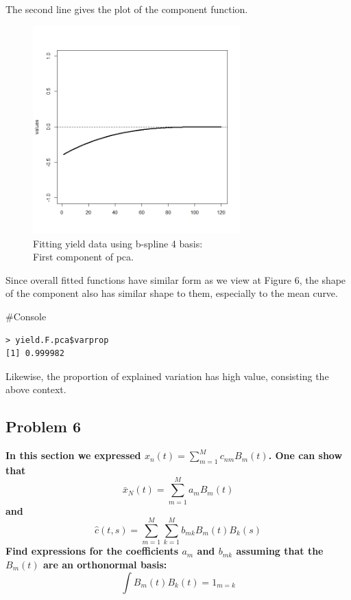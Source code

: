 \documentclass{article}
\newenvironment{console}%
{%
    \begin{mdframed}
    \#Console
    \begin{small}
}
{%
    \end{small}
    \end{mdframed}
}
\begin{document}
The second line gives the plot of the component function.
\begin{figure}[hh]
    \centering
    \includegraphics[height=8cm]{yield_bspline4fit_pca_1comp.png}
    \caption{Fitting yield data using b-spline 4 basis:\\ First component of pca.}
\end{figure}

Since overall fitted functions have similar form as we view at Figure 6, the shape of the component also has similar shape to them, especially to the mean curve.

\begin{console}
    \begin{verbatim}
> yield.F.pca$varprop
[1] 0.999982
    \end{verbatim}
\end{console}

Likewise, the proportion of explained variation has high value, consisting the above context.

\newpage
\subsection{Problem 6}
\textbf{
In this section we expressed \(x_n(t)=\sum_{m=1}^{M}c_{nm}B_m(t)\). One can show that
\[\bar{x}_N(t)=\sum_{m=1}^{M}a_mB_m(t) \]
and
\[\hat{c}(t,s)=\sum_{m=1}^{M}\sum_{k=1}^Mb_{mk}B_m(t)B_k(s)\]
Find expressions for the coefficients $a_m$ and $b_{mk}$ assuming that the
$B_m(t)$ are an orthonormal basis:
\[\int B_m(t)B_k(t)=1_{m=k}\]
}
\\
\end{document}
